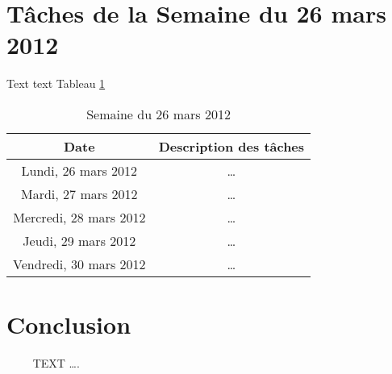 \section{T\^{a}ches de la Semaine du 26 mars 2012}
Text text Tableau \ref{week5}
\begin{table}[!h]
\begin{center}
\caption{Semaine du 26 mars 2012} \label{week5}
\begin{tabular}{|c|c|}
  \hline
 \textbf{Date}  & \textbf{Description des t\^{a}ches} \\ \hline
  Lundi, 26 mars 2012 & \ldots \\ \hline
  Mardi, 27 mars 2012 & \ldots \\ \hline
  Mercredi, 28 mars 2012 & \ldots \\ \hline
  Jeudi, 29 mars 2012 & \ldots \\ \hline
  Vendredi, 30 mars 2012 & \ldots \\
  \hline
\end{tabular}
\end{center}
\end{table}
\section{Conclusion}
~~~~ TEXT \ldots.
